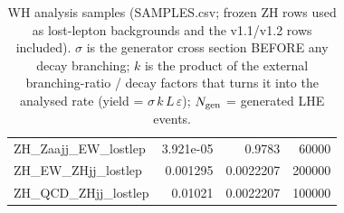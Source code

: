 \begin{table}[ht]
\begin{tabular}{lrrr}
ZH\_Zaajj\_EW\_lostlep & 3.921e-05 & 0.9783 & 60000 \\
ZH\_EW\_ZHjj\_lostlep & 0.001295 & 0.0022207 & 200000 \\
ZH\_QCD\_ZHjj\_lostlep & 0.01021 & 0.0022207 & 100000 \\\hline
\end{tabular}
\caption{WH analysis samples (SAMPLES.csv; frozen ZH rows used as lost-lepton backgrounds and the v1.1/v1.2 rows included). $\sigma$ is the generator cross section BEFORE any decay branching; $k$ is the product of the external branching-ratio / decay factors that turns it into the analysed rate (yield = $\sigma\,k\,L\,\varepsilon$); $N_{\rm gen}$ = generated LHE events.}
\end{table}
